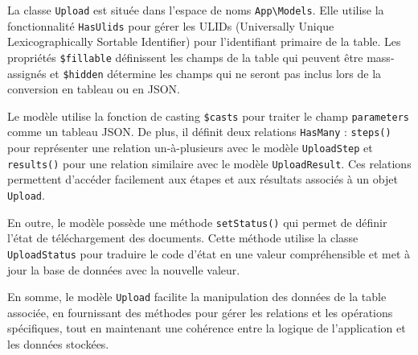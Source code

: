 La classe \Verb|Upload| est située dans l'espace de noms \Verb|App\Models|. Elle utilise la fonctionnalité \Verb|HasUlids| pour gérer les ULIDs (Universally Unique Lexicographically Sortable Identifier) pour l'identifiant primaire de la table. Les propriétés \Verb|$fillable| définissent les champs de la table qui peuvent être mass-assignés et \Verb|$hidden| détermine les champs qui ne seront pas inclus lors de la conversion en tableau ou en JSON.

Le modèle utilise la fonction de casting \Verb|$casts| pour traiter le champ \Verb|parameters| comme un tableau JSON. De plus, il définit deux relations \Verb|HasMany| : \Verb|steps()| pour représenter une relation un-à-plusieurs avec le modèle \Verb|UploadStep| et \Verb|results()| pour une relation similaire avec le modèle \Verb|UploadResult|. Ces relations permettent d'accéder facilement aux étapes et aux résultats associés à un objet \Verb|Upload|.

En outre, le modèle possède une méthode \Verb|setStatus()| qui permet de définir l'état de téléchargement des documents. Cette méthode utilise la classe \Verb|UploadStatus| pour traduire le code d'état en une valeur compréhensible et met à jour la base de données avec la nouvelle valeur.

En somme, le modèle \Verb|Upload| facilite la manipulation des données de la table associée, en fournissant des méthodes pour gérer les relations et les opérations spécifiques, tout en maintenant une cohérence entre la logique de l'application et les données stockées.